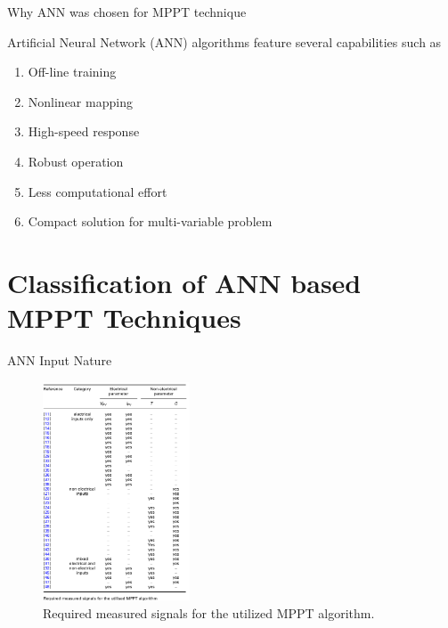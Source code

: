 \documentclass[10pt]{beamer}
\begin{document}
\begin{frame}{Why ANN was chosen for MPPT technique}

Artificial Neural Network (ANN) algorithms feature several capabilities such as 

\begin{enumerate}
	\item{Off-line training}
    \item{Nonlinear mapping}
    \item{High-speed response}
    \item{Robust operation}
    \item{Less computational effort}
    \item{Compact solution for multi-variable problem}
\end{enumerate}

\end{frame}

\section{Classification of ANN based MPPT Techniques}

\begin{frame}{ANN Input Nature}
	\begin{figure}
    	\centering
        \includegraphics[width=.6\linewidth, height=6.5cm]{mppt.png}
        \caption{Required measured signals for the utilized MPPT algorithm.}
        \label{fig:mppt}
    \end{figure}
\end{frame}
\end{document}
